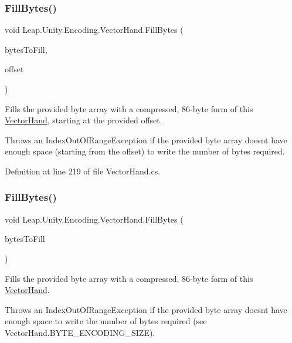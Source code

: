 \subsubsection{\texorpdfstring{FillBytes()}{FillBytes()}\hspace{0.1cm}{\footnotesize\ttfamily [1/3]}}
{\footnotesize\ttfamily void Leap.\+Unity.\+Encoding.\+Vector\+Hand.\+Fill\+Bytes (\begin{DoxyParamCaption}\item[{byte \mbox{[}$\,$\mbox{]}}]{bytes\+To\+Fill,  }\item[{ref int}]{offset }\end{DoxyParamCaption})}



Fills the provided byte array with a compressed, 86-\/byte form of this \mbox{\hyperlink{class_leap_1_1_unity_1_1_encoding_1_1_vector_hand}{Vector\+Hand}}, starting at the provided offset. 

Throws an Index\+Out\+Of\+Range\+Exception if the provided byte array doesn\textquotesingle{}t have enough space (starting from the offset) to write the number of bytes required. 

Definition at line 219 of file Vector\+Hand.\+cs.

\mbox{\label{class_leap_1_1_unity_1_1_encoding_1_1_vector_hand_af5ad73d71bf71937153af3c6049ead52}} 
\subsubsection{\texorpdfstring{FillBytes()}{FillBytes()}\hspace{0.1cm}{\footnotesize\ttfamily [2/3]}}
{\footnotesize\ttfamily void Leap.\+Unity.\+Encoding.\+Vector\+Hand.\+Fill\+Bytes (\begin{DoxyParamCaption}\item[{byte \mbox{[}$\,$\mbox{]}}]{bytes\+To\+Fill }\end{DoxyParamCaption})}



Fills the provided byte array with a compressed, 86-\/byte form of this \mbox{\hyperlink{class_leap_1_1_unity_1_1_encoding_1_1_vector_hand}{Vector\+Hand}}. 

Throws an Index\+Out\+Of\+Range\+Exception if the provided byte array doesn\textquotesingle{}t have enough space to write the number of bytes required (see Vector\+Hand.\+B\+Y\+T\+E\+\_\+\+E\+N\+C\+O\+D\+I\+N\+G\+\_\+\+S\+I\+ZE). 

